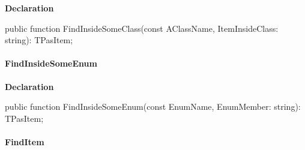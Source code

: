 \documentclass{report}
\newif\ifpdf
\begin{document}
\label{PasDoc_Items.TPasUnit-FindInsideSomeClass}
\begin{list}{}{
\setlength{\itemindent}{0cm}
\setlength{\listparindent}{0cm}
\setlength{\leftmargin}{\evensidemargin}
\addtolength{\leftmargin}{\tmplength}
\settowidth{\labelsep}{X}
\addtolength{\leftmargin}{\labelsep}
\setlength{\labelwidth}{\tmplength}
}
\item[\textbf{Declaration}\hfill]
\ifpdf
\begin{flushleft}
\fi
\begin{ttfamily}
public function FindInsideSomeClass(const AClassName, ItemInsideClass: string): TPasItem;\end{ttfamily}

\ifpdf
\end{flushleft}
\fi

\end{list}
\paragraph*{FindInsideSomeEnum}\hspace*{\fill}

\label{PasDoc_Items.TPasUnit-FindInsideSomeEnum}
\begin{list}{}{
\setlength{\itemindent}{0cm}
\setlength{\listparindent}{0cm}
\setlength{\leftmargin}{\evensidemargin}
\addtolength{\leftmargin}{\tmplength}
\settowidth{\labelsep}{X}
\addtolength{\leftmargin}{\labelsep}
\setlength{\labelwidth}{\tmplength}
}
\item[\textbf{Declaration}\hfill]
\ifpdf
\begin{flushleft}
\fi
\begin{ttfamily}
public function FindInsideSomeEnum(const EnumName, EnumMember: string): TPasItem;\end{ttfamily}

\ifpdf
\end{flushleft}
\fi

\end{list}
\paragraph*{FindItem}\hspace*{\fill}
\end{document}
